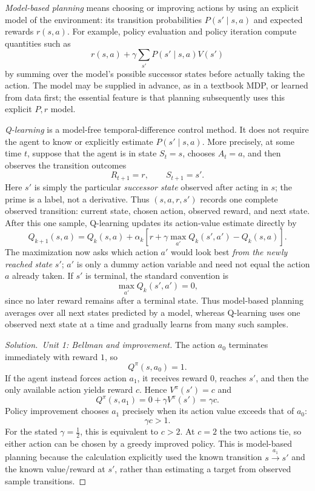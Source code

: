 \documentclass[11pt,a4paper]{article}
\theoremstyle{definition}
\newenvironment{solution}[1][]{\begin{proof}[Solution.\ #1]}{\end{proof}}
\begin{document}
\begin{definition}\label{def:planning-qlearning}
\emph{Model-based planning} means choosing or improving actions by using an explicit model of
the environment: its transition probabilities $P(s'\mid s,a)$ and expected rewards
$r(s,a)$. For example, policy evaluation and policy iteration compute quantities such as
\[
r(s,a)+\gamma\sum_{s'}P(s'\mid s,a)V(s')
\]
by summing over the model's possible successor states before actually taking the action.
The model may be supplied in advance, as in a textbook MDP, or learned from data first; the
essential feature is that planning subsequently uses this explicit $P,r$ model.

\emph{Q-learning} is a model-free temporal-difference control method. It does not require
the agent to know or explicitly estimate $P(s'\mid s,a)$. More precisely, at some time $t$,
suppose that the agent is in state $S_t=s$, chooses $A_t=a$, and then observes the transition
outcomes
\[
R_{t+1}=r,
\qquad
S_{t+1}=s'.
\]
Here $s'$ is simply the particular \emph{successor state} observed after acting in $s$; the
prime is a label, not a derivative. Thus $(s,a,r,s')$ records one complete observed transition:
current state, chosen action, observed reward, and next state. After this one sample, Q-learning
updates its action-value estimate directly by
\[
Q_{k+1}(s,a)
=Q_k(s,a)+\alpha_k
\left[r+\gamma\max_{a'}Q_k(s',a')-Q_k(s,a)\right].
\]
The maximization now asks which action $a'$ would look best \emph{from the newly reached state}
$s'$; $a'$ is only a dummy action variable and need not equal the action $a$ already taken.
If $s'$ is terminal, the standard convention is
\[
\max_{a'}Q_k(s',a')=0,
\]
since no later reward remains after a terminal state.
Thus model-based planning averages over all next states predicted by a model, whereas
Q-learning uses one observed next state at a time and gradually learns from many such
samples.
\end{definition}

\begin{solution}[Unit 1: Bellman and improvement]
The action $a_0$ terminates immediately with reward $1$, so
\[
Q^\pi(s,a_0)=1.
\]
If the agent instead forces action $a_1$, it receives reward $0$, reaches $s'$, and then
the only available action yields reward $c$. Hence $V^\pi(s')=c$ and
\[
Q^\pi(s,a_1)=0+\gamma V^\pi(s')=\gamma c.
\]
Policy improvement chooses $a_1$ precisely when its action value exceeds that of $a_0$:
\[
\gamma c>1.
\]
For the stated $\gamma=\tfrac12$, this is equivalent to $c>2$. At $c=2$ the two actions tie,
so either action can be chosen by a greedy improved policy. This is model-based planning
because the calculation explicitly used the known transition $s\xrightarrow{a_1}s'$ and
the known value/reward at $s'$, rather than estimating a target from observed sample
transitions.
\end{solution}
\end{document}
